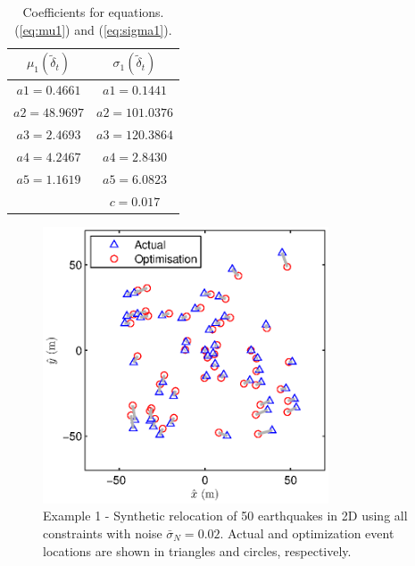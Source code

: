 \documentclass[extra, onecolumn, doublespacing]{gji}
\begin{document}
\begin{table}
\caption{Coefficients for equations. (\ref{eq:mu1}) and
(\ref{eq:sigma1}).} \label{tab-const4-mu1-sigma1}
\begin{tabular}{|c|c|}
\hline
$\mu_1(\widetilde{\delta}_t)$ & $\sigma_1(\widetilde{\delta}_t)$ \\
\hline
$a1 = 0.4661$ & $a1 = 0.1441$\\
$a2 = 48.9697$ & $a2 = 101.0376$\\
$a3 = 2.4693$ & $a3 = 120.3864$\\
$a4 = 4.2467$ & $a4 = 2.8430$\\
$a5 = 1.1619$ & $a5 = 6.0823$ \\
     & $c = 0.017$ \\
\hline
\end{tabular}
\end{table}


\clearpage


\begin{figure}
\includegraphics[width = 20pc]{Figure1_c.eps}
\caption{Example 1 - Synthetic relocation of 50 earthquakes in 2D
using all constraints with noise $\bar{\sigma}_N=0.02$. Actual and
optimization event locations are shown in triangles and circles,
respectively.} \label{fig-2D50eq-relocation_eg1}
\end{figure}
\end{document}
